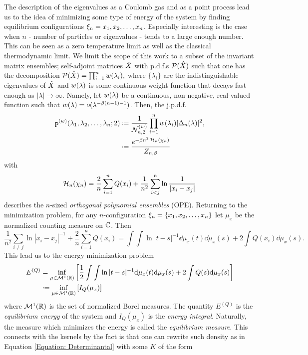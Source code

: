 The description of the eigenvalues as a Coulomb gas and as a point process lead us to the idea of minimizing some type of energy of the system by finding equilibrium configurations $\xi_n = x_1, x_2, \dots, x_n$. Especially interesting is the case when $n$ - number of particles or eigenvalues - tends to a large enough number. This can be seen as a zero temperature limit as well as the classical thermodynamic limit. We limit the scope of this work to a subset of the invariant matrix ensembles; self-adjoint matrices $\hat X$ with p.d.f.s $\mathcal{P}(\hat X)$ such that one has the decomposition
$
\mathcal{P}(\hat X) = \prod_{i=1}^n w(\lambda_i),
$
where $\{\lambda_i\}$ are the indistinguishable eigenvalues of $\hat X$ and $w(\lambda)$ is some continuous weight function that decays fast enough as $|\lambda| \rightarrow \infty$. Namely, let $w(\lambda)$ be a continuous, non-negative, real-valued function such that $w(\lambda) = o(\lambda^{-\beta(n-1)-1})$. Then, the j.p.d.f.
\begin{align}
	\p^{(w)}(\mmany{\lambda}{n};2) & \deff \frac{1}{\pN{n,2}{(w)}} \prod_{i=1}^{n} \wf(\lambda_i) |\Delta_n(\lambda)|^2, \\
	& \deff	\frac{e^{-\beta n^2 \Hf_n(\chi_n)}}{Z_{n,\beta}}
\end{align}
with
\begin{equation}
	\operatorname{\mathcal{H}}_n(\chi_n) = \frac{2}{n} \sum_{i = 1}^{n} Q(x_i) + \frac{1}{n^2} \sum_{i < j}^{n} \ln{\frac{1}{|x_i - x_j|}}
\end{equation}
describes the $n$-sized \textit{orthogonal polynomial ensembles} (OPE). Returning to the minimization problem, for any $n$-configuration $\xi_n = \{x_1, x_2, \dots, x_n\}$ let $\mu_x$ be the normalized counting measure on $\mathbb{C}$. Then
\begin{equation}
	\frac{1}{n^2} \sum_{i \neq j} \ln{|x_i - x_j|^{-1}} + \frac{2}{n} \sum_{i=1}^n Q(x_i) = 	\int \int \ln |t - s|^{-1} \dd \mu_x(t) \dd \mu_x(s) + 2 \int Q(x_i) \dd  \mu_x (s).
\end{equation}
This lead us to the energy minimization problem 
\begin{align}
	E^{(Q)} & = \inf_{\mu \in \mathcal{M}^1(\R)} \left[\frac{1}{2} \int \int \ln |t - s|^{-1} \dd \mu_x(t) \dd \mu_x(s) + 2 \int Q(s) \dd  \mu_x (s) \right] \\\ & \deff \inf_{\mu \in \mathcal{M}^1(\R)} \left[ I_Q(\mu_x) \right]
\end{align}
where $\mathcal{M}^1(\mathbb{R})$ is the set of normalized Borel measures. The quantity $E^{(Q)}$ is the \textit{equilibrium energy} of the system and $I_Q(\mu_x)$ is the \textit{energy integral}. Naturally, the measure which minimizes the energy is called the \textit{equilibrium measure}. This connects with the kernels by the fact is that one can rewrite such density as in Equation \eqref{Equation: Determinantal} with some $K$ of the form
